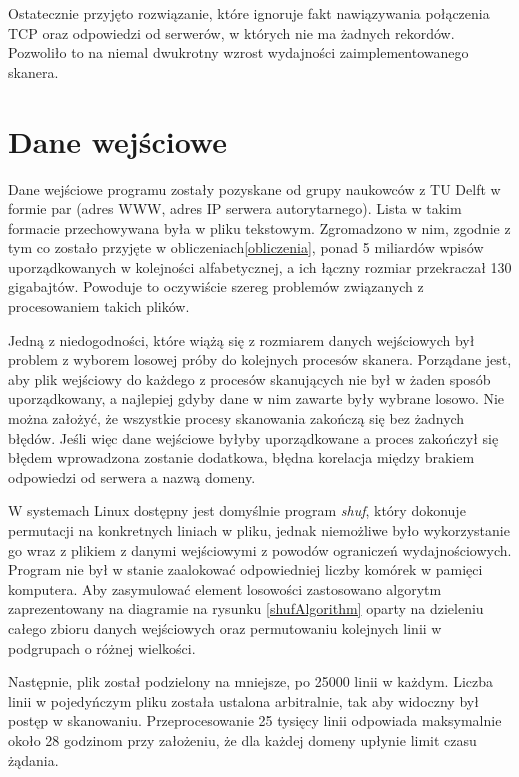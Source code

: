 Ostatecznie przyjęto rozwiązanie, które ignoruje fakt nawiązywania połączenia TCP oraz odpowiedzi od serwerów, w których nie ma żadnych rekordów. Pozwoliło to na niemal dwukrotny wzrost wydajności zaimplementowanego skanera.

\section{Dane wejściowe}
Dane wejściowe programu zostały pozyskane od grupy naukowców z TU Delft\cite{delft} w formie par (adres WWW, adres IP serwera autorytarnego). Lista w takim formacie przechowywana była w pliku tekstowym. Zgromadzono w nim, zgodnie z tym co zostało przyjęte w obliczeniach\ref{obliczenia}, ponad 5 miliardów wpisów uporządkowanych w kolejności alfabetycznej, a ich łączny rozmiar przekraczał 130 gigabajtów. Powoduje to oczywiście szereg problemów związanych z procesowaniem takich plików. 

Jedną z niedogodności, które wiążą się z rozmiarem danych wejściowych był problem z wyborem losowej próby do kolejnych procesów skanera. Porządane jest, aby plik wejściowy do każdego z procesów skanujących nie był w żaden sposób uporządkowany, a najlepiej gdyby dane w nim zawarte były wybrane losowo. Nie można założyć, że wszystkie procesy skanowania zakończą się bez żadnych błędów. Jeśli więc dane wejściowe byłyby uporządkowane a proces zakończył się błędem wprowadzona zostanie dodatkowa, błędna korelacja między brakiem odpowiedzi od serwera a nazwą domeny.

W systemach Linux dostępny jest domyślnie program \textit{shuf}\cite{shuf}, który dokonuje permutacji na konkretnych liniach w pliku, jednak niemożliwe było wykorzystanie go wraz z plikiem z danymi wejściowymi z powodów ograniczeń wydajnościowych. Program nie był w stanie zaalokować odpowiedniej liczby komórek w pamięci komputera. Aby zasymulować element losowości zastosowano algorytm zaprezentowany na diagramie na rysunku \ref{shufAlgorithm} oparty na dzieleniu całego zbioru danych wejściowych oraz permutowaniu kolejnych linii w podgrupach o różnej wielkości.

Następnie, plik został podzielony na mniejsze, po 25000 linii w każdym. Liczba linii w pojedyńczym pliku została ustalona arbitralnie, tak aby widoczny był postęp w skanowaniu. Przeprocesowanie 25 tysięcy linii odpowiada maksymalnie około 28 godzinom przy założeniu, że dla każdej domeny upłynie limit czasu żądania.

